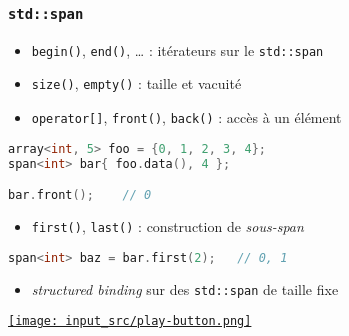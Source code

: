 \documentclass[C++.tex]{subfiles}
\begin{document}
\begin{frame}[fragile]
	\frametitle{\lstinline|std::span|}
	\begin{itemize}
		\item \lstinline|begin()|, \lstinline|end()|, \ldots{} : itérateurs sur le \lstinline|std::span|
		\item \lstinline|size()|, \lstinline|empty()| : taille et vacuité
		\item \lstinline|operator[]|, \lstinline|front()|, \lstinline|back()| : accès à un élément
	\end{itemize}

	\begin{lstlisting}[language=C++]
array<int, 5> foo = {0, 1, 2, 3, 4};
span<int> bar{ foo.data(), 4 };

bar.front();    // 0\end{lstlisting}

	\begin{itemize}
		\item \lstinline|first()|, \lstinline|last()| : construction de \textit{sous-span}
	\end{itemize}

		\begin{lstlisting}[language=C++]
span<int> baz = bar.first(2);   // 0, 1\end{lstlisting}

	\begin{itemize}
		\item \textit{structured binding} sur des \lstinline|std::span| de taille fixe
	\end{itemize}

	\hfill
	\href{https://godbolt.org/#g:!((g:!((g:!((h:codeEditor,i:(filename:'1',fontScale:14,fontUsePx:'0',j:1,lang:c%2B%2B,selection:(endColumn:1,endLineNumber:21,positionColumn:1,positionLineNumber:21,selectionStartColumn:1,selectionStartLineNumber:1,startColumn:1,startLineNumber:1),source:'%23include+%3Carray%3E%0A%23include+%3Cspan%3E%0A%23include+%3Ciostream%3E%0A%0Aint+main()%0A%7B%0A++std::array%3Cint,+5%3E+foo+%3D+%7B7,+12,+28,+3,+9%7D%3B%0A++std::span%3Cint%3E+bar(foo.data(),+3)%3B%0A%0A++std::cout+%3C%3C+bar.size()+%3C%3C+%22%5Cn%22%3B%0A++std::cout+%3C%3C+bar.front()+%3C%3C+%22%5Cn%22%3B+%0A++std::cout+%3C%3C+bar%5B2%5D+%3C%3C+%22%5Cn%22%3B+%0A%0A++std::span%3Cint%3E+baz+%3D+bar.first(2)%3B%0A++for(const+auto+i+:+baz)%0A++%7B%0A++++std::cout+%3C%3C+i+%3C%3C+%22+%22%3B%0A++%7D%0A++std::cout+%3C%3C+%22%5Cn%22%3B%0A%7D%0A'),l:'5',n:'0',o:'C%2B%2B+source+%231',t:'0')),k:50,l:'4',n:'0',o:'',s:0,t:'0'),(g:!((h:executor,i:(argsPanelShown:'1',compilationPanelShown:'0',compiler:g122,compilerName:'',compilerOutShown:'0',execArgs:'',execStdin:'',fontScale:14,fontUsePx:'0',j:1,lang:c%2B%2B,libs:!((name:boost,ver:'175')),options:'-std%3Dc%2B%2B20+-Wall+-Wextra+-pedantic',source:1,stdinPanelShown:'1',tree:'1',wrap:'0'),l:'5',n:'0',o:'Executor+x86-64+gcc+12.2+(C%2B%2B,+Editor+%231)',t:'0')),header:(),k:50,l:'4',n:'0',o:'',s:0,t:'0')),l:'2',n:'0',o:'',t:'0')),version:4}{\texttt{[image: input\_src/play-button.png]}}
\end{frame}
\end{document}
